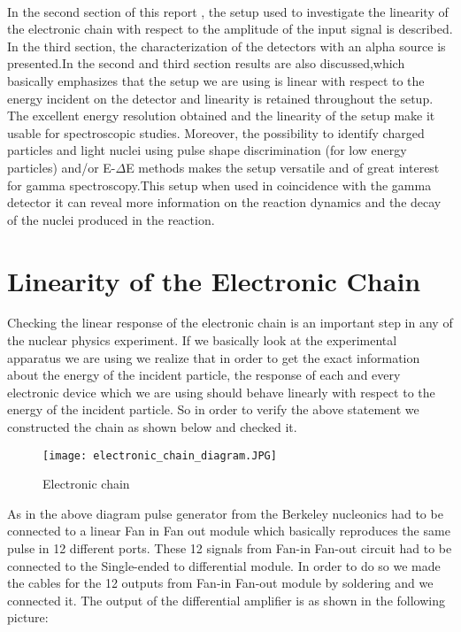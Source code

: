 \documentclass[a4paper, 11pt]{article}
\begin{document}
\paragraph{}
In the  second section of this report , the setup used to investigate the linearity of the electronic chain with respect to the amplitude of the input signal is described. In the third section, the characterization of the detectors with an alpha source is presented.In the second and third section results are also discussed,which basically emphasizes that the setup we are using is linear with respect to the energy incident on the detector and linearity is retained throughout the setup. The excellent energy resolution obtained and the linearity of the setup make it usable for spectroscopic studies. Moreover, the possibility to identify charged particles and light nuclei using pulse shape discrimination (for low energy particles) and/or E-$\Delta$E methods makes the setup versatile and of great interest for gamma spectroscopy.This setup when used in coincidence with the gamma detector it can reveal more information on the reaction dynamics and the decay of the nuclei produced in the reaction.


\section{Linearity of the Electronic Chain}
Checking the linear response of the electronic chain is an important step in any of the nuclear physics experiment. If we basically look at the experimental apparatus we are using we realize that in order to get the exact information about the energy of the incident particle, the response of each and every electronic device which we are using should behave linearly with respect to the energy of the incident particle. So in order to verify the above statement we constructed the chain as shown below and checked it.

\begin{figure}[h]
    \centering
    \texttt{[image: electronic\_chain\_diagram.JPG]}
    \caption{Electronic chain}
    \label{fig:my_label}
\end{figure}


As in the above diagram pulse generator from the Berkeley nucleonics had to be connected to a linear Fan in Fan out module which basically reproduces the same pulse in 12 different ports. These 12 signals from Fan-in Fan-out circuit had to be connected to the Single-ended to differential module. In order to do so we made the cables for the 12 outputs from Fan-in Fan-out module by soldering and we connected it. The output of the differential amplifier is as shown in the following picture:
\end{document}
